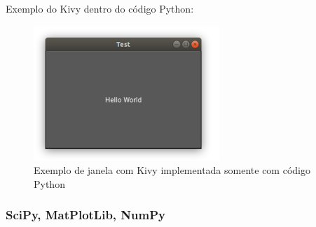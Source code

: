             Exemplo do Kivy dentro do código Python:
            \begin{quote}
                                                                                 
            \end{quote}
            
            \begin{figure}[h]
                \caption{Exemplo de janela com Kivy implementada somente com código Python}
                \begin{center}
                    \includegraphics[width=7cm]{texto/fig/hello_world_kivy.png} 
                \end{center}
                \label{janela_kivy} 
            \end{figure}


            
            \subsubsection{SciPy, MatPlotLib, NumPy}
            \label{lim_scipy}
            
